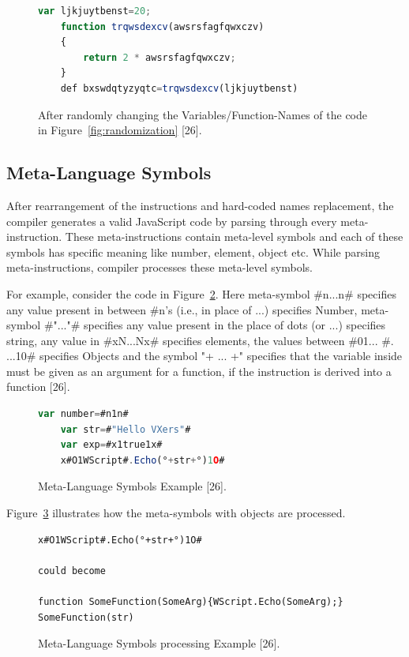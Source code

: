 \begin{figure}
  \centering
  \begin{lstlisting}[language=JavaScript]
	var ljkjuytbenst=20;
	function trqwsdexcv(awsrsfagfqwxczv) 
	{ 
		return 2 * awsrsfagfqwxczv; 
	}
	def bxswdqtyzyqtc=trqwsdexcv(ljkjuytbenst)
\end{lstlisting}
    \caption[After Variable/Function-Name randomization]{After randomly changing the Variables/Function-Names of the code in Figure~\ref{fig:randomization} [26].}
    \label{fig:afterrandomization}
\end{figure}

\subsection{Meta-Language Symbols}

After rearrangement of the instructions and hard-coded names replacement, the compiler generates a valid JavaScript code by parsing through every meta-instruction. These meta-instructions contain meta-level symbols and each of these symbols has specific meaning like number, element, object etc. While parsing meta-instructions, compiler processes these meta-level symbols.

For example, consider the code in Figure~\ref{fig:metalanguage}. Here meta-symbol \#n...n\# specifies any value present in between \#n's (i.e., in place of ...) specifies Number, meta-symbol \#"..."\# specifies any value present in the place of dots (or ...) specifies string, any value in \#xN...Nx\# specifies elements, the values between \#01... \#. ...10\# specifies Objects and the symbol "\textdegree+ ... +\textdegree" specifies that the variable inside must be given as an argument for a function, if the instruction is derived into a function [26].

\begin{figure}
  \centering
  \begin{lstlisting}[language=JavaScript]
	var number=#n1n#					
	var str=#"Hello VXers"#				
	var exp=#x1true1x#					
	x#O1WScript#.Echo(°+str+°)1O#
\end{lstlisting}
    \caption[Meta-Language Symbols Example]{Meta-Language Symbols Example [26].}
    \label{fig:metalanguage}
\end{figure}

Figure~\ref{fig:metalanguageprocessing} illustrates how the meta-symbols with objects are processed.

\begin{figure}
  \centering
  \begin{lstlisting}[language=myasm,numbers=none]
x#O1WScript#.Echo(°+str+°)1O# 

could become

function SomeFunction(SomeArg){WScript.Echo(SomeArg);}
SomeFunction(str)
\end{lstlisting}
    \caption[Meta-Language Symbols processing Example]{Meta-Language Symbols processing Example [26].}
    \label{fig:metalanguageprocessing}
\end{figure}

